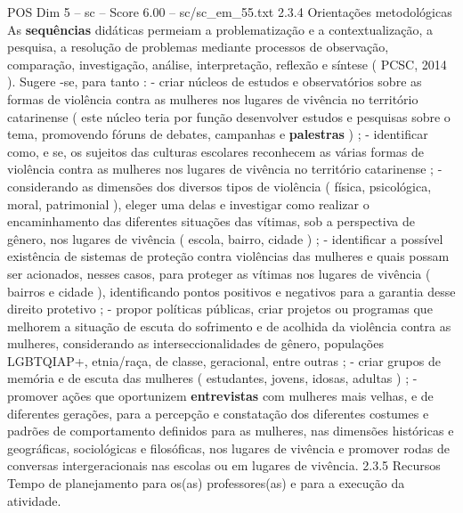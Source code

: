 \begin{textsample}{POS Dim 5 – sc – Score 6.00 – sc/sc\_em\_55.txt}  \label{ex:f5_pos_039}
2.3.4 Orientações metodológicas As \textbf{sequências} didáticas permeiam a problematização e a contextualização, a pesquisa, a resolução de problemas mediante processos de observação, comparação, investigação, análise, interpretação, reflexão e síntese ( PCSC, 2014 ).
Sugere -se, para tanto : - criar núcleos de estudos e observatórios sobre as formas de violência contra as mulheres nos lugares de vivência no território catarinense ( este núcleo teria por função desenvolver estudos e pesquisas sobre o tema, promovendo fóruns de debates, campanhas e \textbf{palestras} ) ; - identificar como, e se, os sujeitos das culturas escolares reconhecem as várias formas de violência contra as mulheres nos lugares de vivência no território catarinense ; - considerando as dimensões dos diversos tipos de violência ( física, psicológica, moral, patrimonial ), eleger uma delas e investigar como realizar o encaminhamento das diferentes situações das vítimas, sob a perspectiva de gênero, nos lugares de vivência ( escola, bairro, cidade ) ; - identificar a possível existência de sistemas de proteção contra violências das mulheres e quais possam ser acionados, nesses casos, para proteger as vítimas nos lugares de vivência ( bairros e cidade ), identificando pontos positivos e negativos para a garantia desse direito protetivo ; - propor políticas públicas, criar projetos ou programas que melhorem a situação de escuta do sofrimento e de acolhida da violência contra as mulheres, considerando as interseccionalidades de gênero, populações LGBTQIAP+, etnia/raça, de classe, geracional, entre outras ; - criar grupos de memória e de escuta das mulheres ( estudantes, jovens, idosas, adultas ) ; - promover ações que oportunizem \textbf{entrevistas} com mulheres mais velhas, e de diferentes gerações, para a percepção e constatação dos diferentes costumes e padrões de comportamento definidos para as mulheres, nas dimensões históricas e geográficas, sociológicas e filosóficas, nos lugares de vivência e promover rodas de conversas intergeracionais nas escolas ou em lugares de vivência. 2.3.5 Recursos Tempo de planejamento para os(as) professores(as) e para a execução da atividade.

\end{textsample}
